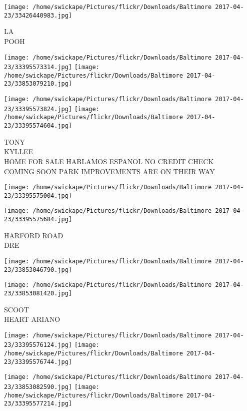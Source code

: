 \documentclass[10pt,letterpaper]{article}
\begin{document}
\vspace{0.25in}
\texttt{[image: /home/swickape/Pictures/flickr/Downloads/Baltimore 2017-04-23/33426440983.jpg]}

LA\\
POOH
\pagebreak

\texttt{[image: /home/swickape/Pictures/flickr/Downloads/Baltimore 2017-04-23/33395573314.jpg]}
\texttt{[image: /home/swickape/Pictures/flickr/Downloads/Baltimore 2017-04-23/33853079210.jpg]}

\texttt{[image: /home/swickape/Pictures/flickr/Downloads/Baltimore 2017-04-23/33395573824.jpg]}
\texttt{[image: /home/swickape/Pictures/flickr/Downloads/Baltimore 2017-04-23/33395574604.jpg]}

TONY\\
KYLLEE\\
HOME FOR SALE HABLAMOS ESPANOL NO CREDIT CHECK\\
COMING SOON PARK IMPROVEMENTS ARE ON THEIR WAY
\pagebreak

\texttt{[image: /home/swickape/Pictures/flickr/Downloads/Baltimore 2017-04-23/33395575004.jpg]}

\vspace{0.25in}
\texttt{[image: /home/swickape/Pictures/flickr/Downloads/Baltimore 2017-04-23/33395575684.jpg]}

HARFORD ROAD\\
DRE
\pagebreak

\texttt{[image: /home/swickape/Pictures/flickr/Downloads/Baltimore 2017-04-23/33853046790.jpg]}

\vspace{0.25in}
\texttt{[image: /home/swickape/Pictures/flickr/Downloads/Baltimore 2017-04-23/33853081420.jpg]}

SCOOT\\
HEART ARIANO
\pagebreak

\texttt{[image: /home/swickape/Pictures/flickr/Downloads/Baltimore 2017-04-23/33395576124.jpg]}
\texttt{[image: /home/swickape/Pictures/flickr/Downloads/Baltimore 2017-04-23/33395576744.jpg]}

\texttt{[image: /home/swickape/Pictures/flickr/Downloads/Baltimore 2017-04-23/33853082590.jpg]}
\texttt{[image: /home/swickape/Pictures/flickr/Downloads/Baltimore 2017-04-23/33395577214.jpg]}
\end{document}
